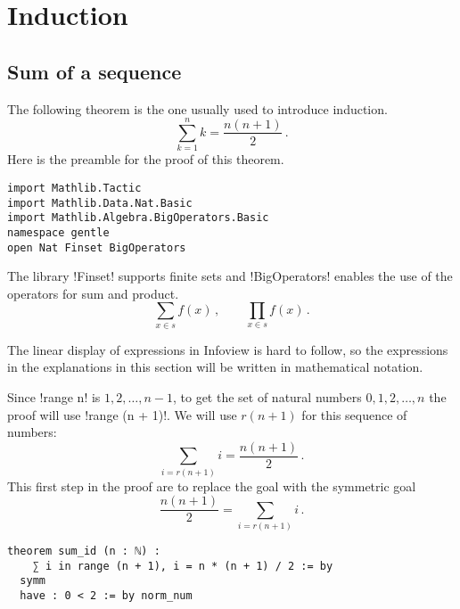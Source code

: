 
\section{Induction}

\subsection{Sum of a sequence}

The following theorem is the one usually used to introduce induction.
\[
\sum_{k=1}^{n} k = \frac{n(n+1)}{2}\,.
\]
Here is the preamble for the proof of this theorem.
\begin{Verbatim}
import Mathlib.Tactic
import Mathlib.Data.Nat.Basic
import Mathlib.Algebra.BigOperators.Basic
namespace gentle
open Nat Finset BigOperators
\end{Verbatim}

The library !Finset! supports finite sets and !BigOperators! enables the use of the operators for sum and product.
\[
\sum_{x\in s} f(x)\,, \quad \quad \prod_{x\in s} f(x)\,.
\]


The linear display of expressions in Infoview is hard to follow, so the expressions in the explanations in this section will be written in mathematical notation.

Since !range n! is $1,2,\ldots,n-1$, to get the set of natural numbers $0, 1,2,\ldots,n$ the proof will use !range (n + 1)!. We will use $r(n+1)$ for this sequence of numbers:
\[
\sum_{i=r(n+1)} i = \frac{n(n+1)}{2}\,.
\]
This first step in the proof are to replace the goal with the symmetric goal
\[
\frac{n(n+1)}{2} = \sum_{i=r(n+1)} i\,.
\]
\begin{Verbatim}[firstnumber=last]
theorem sum_id (n : ℕ) :
    ∑ i in range (n + 1), i = n * (n + 1) / 2 := by
  symm
  have : 0 < 2 := by norm_num
\end{Verbatim}


